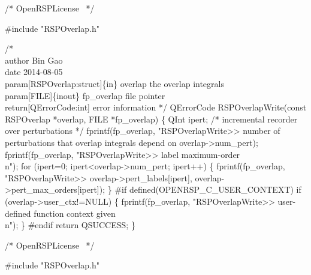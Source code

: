 \nwendcode{}\endmoddef
/*
  \LA{}OpenRSPLicense~{\nwtagstyle{}}\RA{}
*/

#include "RSPOverlap.h"

/*%
    \\author Bin Gao
    \\date 2014-08-05
    \\param[RSPOverlap:struct]\{in\} overlap the overlap integrals
    \\param[FILE]\{inout\} fp_overlap file pointer
    \\return[QErrorCode:int] error information
*/
QErrorCode RSPOverlapWrite(const RSPOverlap *overlap, FILE *fp_overlap)
\{
    QInt ipert;  /* incremental recorder over perturbations */
    fprintf(fp_overlap,
            "RSPOverlapWrite>> number of perturbations that overlap integrals depend on %
            overlap->num_pert);
    fprintf(fp_overlap, "RSPOverlapWrite>> label           maximum-order\\n");
    for (ipert=0; ipert<overlap->num_pert; ipert++) \{
        fprintf(fp_overlap,
                "RSPOverlapWrite>>       %
                overlap->pert_labels[ipert],
                overlap->pert_max_orders[ipert]);
    \}
#if defined(OPENRSP_C_USER_CONTEXT)
    if (overlap->user_ctx!=NULL) \{
        fprintf(fp_overlap, "RSPOverlapWrite>> user-defined function context given\\n");
    \}
#endif
    return QSUCCESS;
\}

\nwendcode{}\endmoddef
/*
  \LA{}OpenRSPLicense~{\nwtagstyle{}}\RA{}
*/

#include "RSPOverlap.h"

